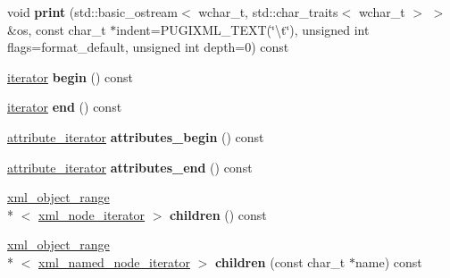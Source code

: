 \begin{DoxyCompactItemize}
\item 
\hypertarget{classpugi_1_1xml__node_a59a563de9fb47e3916f35f14a77d19a9}{void {\bfseries print} (std\+::basic\+\_\+ostream$<$ wchar\+\_\+t, std\+::char\+\_\+traits$<$ wchar\+\_\+t $>$ $>$ \&os, const char\+\_\+t $\ast$indent=P\+U\+G\+I\+X\+M\+L\+\_\+\+T\+E\+X\+T(\char`\"{}\textbackslash{}t\char`\"{}), unsigned int flags=format\+\_\+default, unsigned int depth=0) const }\label{classpugi_1_1xml__node_a59a563de9fb47e3916f35f14a77d19a9}

\item 
\hypertarget{classpugi_1_1xml__node_af1cfcc7ccae47095cd781a3c9c9b06e4}{\hyperlink{classpugi_1_1xml__node__iterator}{iterator} {\bfseries begin} () const }\label{classpugi_1_1xml__node_af1cfcc7ccae47095cd781a3c9c9b06e4}

\item 
\hypertarget{classpugi_1_1xml__node_a6e5b29519d6a1f08aa936d96624e095a}{\hyperlink{classpugi_1_1xml__node__iterator}{iterator} {\bfseries end} () const }\label{classpugi_1_1xml__node_a6e5b29519d6a1f08aa936d96624e095a}

\item 
\hypertarget{classpugi_1_1xml__node_a1b4ab605d879cf5623e20505500b836e}{\hyperlink{classpugi_1_1xml__attribute__iterator}{attribute\+\_\+iterator} {\bfseries attributes\+\_\+begin} () const }\label{classpugi_1_1xml__node_a1b4ab605d879cf5623e20505500b836e}

\item 
\hypertarget{classpugi_1_1xml__node_a528b9274b0adeeda5ed12567057bee17}{\hyperlink{classpugi_1_1xml__attribute__iterator}{attribute\+\_\+iterator} {\bfseries attributes\+\_\+end} () const }\label{classpugi_1_1xml__node_a528b9274b0adeeda5ed12567057bee17}

\item 
\hypertarget{classpugi_1_1xml__node_a267ab4724e63940e5a50234fc52bc855}{\hyperlink{classpugi_1_1xml__object__range}{xml\+\_\+object\+\_\+range}\\*
$<$ \hyperlink{classpugi_1_1xml__node__iterator}{xml\+\_\+node\+\_\+iterator} $>$ {\bfseries children} () const }\label{classpugi_1_1xml__node_a267ab4724e63940e5a50234fc52bc855}

\item 
\hypertarget{classpugi_1_1xml__node_afa490049463cabe6c5b5d774d85e5569}{\hyperlink{classpugi_1_1xml__object__range}{xml\+\_\+object\+\_\+range}\\*
$<$ \hyperlink{classpugi_1_1xml__named__node__iterator}{xml\+\_\+named\+\_\+node\+\_\+iterator} $>$ {\bfseries children} (const char\+\_\+t $\ast$name) const }\label{classpugi_1_1xml__node_afa490049463cabe6c5b5d774d85e5569}


\end{DoxyCompactItemize}
